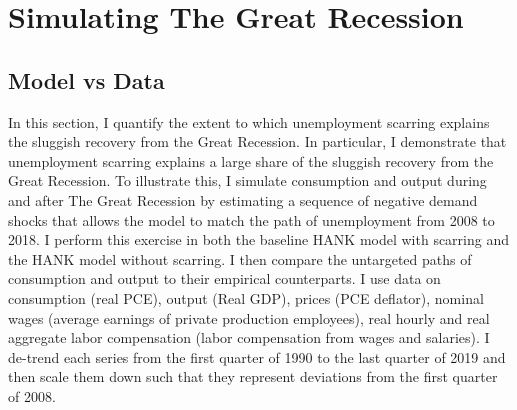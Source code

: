\section{Simulating The Great Recession}


\subsection{Model vs Data}

In this section, I quantify the extent to which unemployment scarring explains the sluggish recovery from the Great Recession. In particular, I demonstrate that unemployment scarring explains a large share of the sluggish recovery from the Great Recession. To illustrate this, I simulate consumption and output during and after The Great Recession by estimating a sequence of negative demand shocks that allows the model to match the path of unemployment from 2008 to 2018. I perform this exercise in both the baseline HANK model with scarring and the HANK model without scarring. I then compare the untargeted paths of consumption and output to their empirical counterparts. I use data on consumption (real PCE), output (Real GDP), prices (PCE deflator), nominal wages (average earnings of private production employees), real hourly and real aggregate labor compensation (labor compensation from wages and salaries). I de-trend each series from the first quarter of 1990 to the last quarter of 2019 and then scale them down such that they represent deviations from the first quarter of 2008. 


